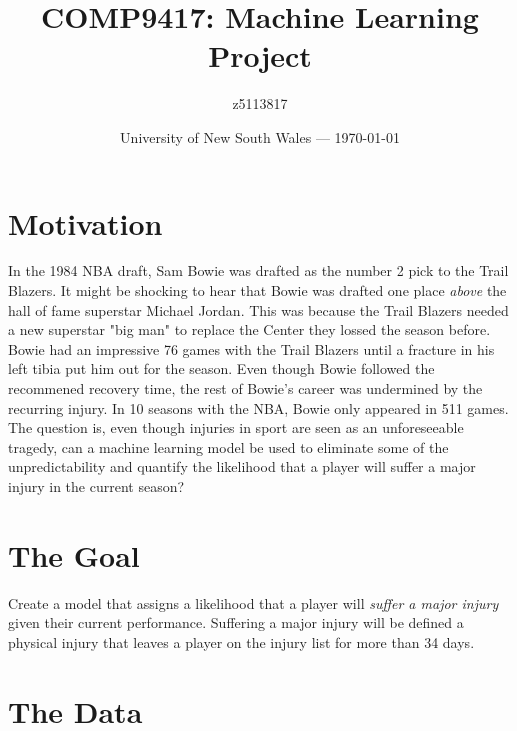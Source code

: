 \documentclass{article}
\title{COMP9417: Machine Learning Project} %
\author{z5113817} %
\date{University of New South Wales --- \today} %
\newcommand{\injurydef}{a physical injury that leaves a player on the injury list for more than 34 days}
\begin{document}
\maketitle %



\section*{Motivation}

In the 1984 NBA draft, Sam Bowie was drafted as the number 2 pick to the Trail Blazers.
It might be shocking to hear that Bowie was drafted one place \emph{above} the hall of fame superstar Michael Jordan.
This was because the Trail Blazers needed a new superstar "big man" to replace the Center they lossed the season before.
Bowie had an impressive 76 games with the Trail Blazers until a fracture in his left tibia put him out for the season.
Even though Bowie followed the recommened recovery time, the rest of Bowie's career was undermined by the recurring injury.
In 10 seasons with the NBA, Bowie only appeared in 511 games.\\

The question is, even though injuries in sport are seen as an unforeseeable tragedy, can a
machine learning model be used to eliminate some of the unpredictability and quantify 
the likelihood that a player will suffer a major injury in the current season?

\section*{The Goal}

Create a model that assigns a likelihood that a player will \emph{suffer a major injury}
given their current performance. Suffering a major injury will be defined \injurydef.

\newpage


\section*{The Data}
\end{document}
